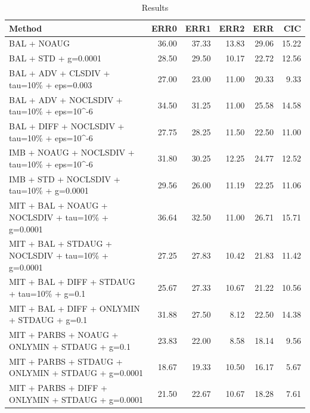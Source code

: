 \begin{table}
\caption{Results}
\label{tab:Results}
\begin{tabular}{lrrrrr}
\toprule
Method & ERR0 & ERR1 & ERR2 & ERR & CIC \\
\midrule
BAL + NOAUG & 36.00 & 37.33 & 13.83 & 29.06 & 15.22 \\
BAL + STD + g=0.0001 & 28.50 & 29.50 & 10.17 & 22.72 & 12.56 \\
BAL + ADV + CLSDIV + tau=10\% + eps=0.003 & 27.00 & 23.00 & 11.00 & 20.33 & 9.33 \\
BAL + ADV + NOCLSDIV + tau=10\% + eps=10\textasciicircum -6 & 34.50 & 31.25 & 11.00 & 25.58 & 14.58 \\
BAL + DIFF + NOCLSDIV + tau=10\% + eps=10\textasciicircum -6 & 27.75 & 28.25 & 11.50 & 22.50 & 11.00 \\
IMB + NOAUG + NOCLSDIV + tau=10\% + eps=10\textasciicircum -6 & 31.80 & 30.25 & 12.25 & 24.77 & 12.52 \\
IMB + STD + NOCLSDIV + tau=10\% + g=0.0001 & 29.56 & 26.00 & 11.19 & 22.25 & 11.06 \\
MIT + BAL + NOAUG + NOCLSDIV + tau=10\% + g=0.0001 & 36.64 & 32.50 & 11.00 & 26.71 & 15.71 \\
MIT + BAL + STDAUG + NOCLSDIV + tau=10\% + g=0.0001 & 27.25 & 27.83 & 10.42 & 21.83 & 11.42 \\
MIT + BAL + DIFF + STDAUG + tau=10\% + g=0.1 & 25.67 & 27.33 & 10.67 & 21.22 & 10.56 \\
MIT + BAL + DIFF + ONLYMIN + STDAUG + g=0.1 & 31.88 & 27.50 & 8.12 & 22.50 & 14.38 \\
MIT + PARBS + NOAUG + ONLYMIN + STDAUG + g=0.1 & 23.83 & 22.00 & 8.58 & 18.14 & 9.56 \\
MIT + PARBS + STDAUG + ONLYMIN + STDAUG + g=0.0001 & 18.67 & 19.33 & 10.50 & 16.17 & 5.67 \\
MIT + PARBS + DIFF + ONLYMIN + STDAUG + g=0.0001 & 21.50 & 22.67 & 10.67 & 18.28 & 7.61 \\
\bottomrule
\end{tabular}
\end{table}
